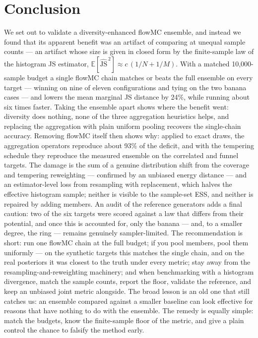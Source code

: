\documentclass[11pt]{article}
\begin{document}
\section{Conclusion}
We set out to validate a diversity-enhanced flowMC ensemble, and instead we
found that its apparent benefit was an artifact of comparing at unequal sample
counts --- an artifact whose size is given in closed form by the
finite-sample law of the histogram JS estimator,
$\mathbb{E}[\widehat{\mathrm{JS}}^{\,2}]\approx c\,(1/N+1/M)$. With a matched
10{,}000-sample budget a single flowMC chain matches or beats the full
ensemble on every target --- winning on nine of eleven configurations and
tying on the two banana cases --- and lowers the mean marginal JS distance by
24\%, while running about six times faster. Taking the ensemble apart shows
where the benefit went: diversity does nothing, none of the three aggregation
heuristics helps, and replacing the aggregation with plain uniform pooling
recovers the single-chain accuracy. Removing flowMC itself then shows why:
applied to exact draws, the aggregation operators reproduce about 93\% of the
deficit, and with the tempering schedule they reproduce the measured ensemble
on the correlated and funnel targets. The damage is the sum of a genuine
distribution shift from the coverage and tempering reweighting --- confirmed
by an unbiased energy distance --- and an estimator-level loss from resampling
with replacement, which halves the effective histogram sample; neither is
visible to the sample-set ESS, and neither is repaired by adding members. An
audit of the reference generators adds a final caution: two of the six targets
were scored against a law that differs from their potential, and once this is
accounted for, only the banana --- and, to a smaller degree, the ring ---
remains genuinely sampler-limited. The
recommendation is short: run one flowMC chain at the full budget; if you pool
members, pool them uniformly --- on the synthetic targets this matches the
single chain, and on the real posteriors it was closest to the truth under
every metric; stay away
from the resampling-and-reweighting machinery; and when benchmarking with a
histogram divergence, match the sample counts, report the floor, validate the
reference, and keep an unbiased joint metric alongside. The broad lesson is an
old one that still catches us: an ensemble compared against a smaller baseline
can look effective for reasons that have nothing to do with the ensemble. The
remedy is equally simple: match the budgets, know the finite-sample floor of
the metric, and give a plain control the chance to falsify the method early.
\end{document}
